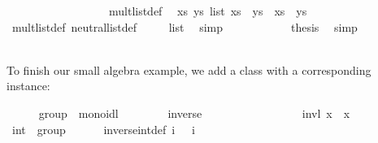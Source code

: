 \begin{isabellebody}
\ \ \ \ \ \ \isamarkupfalse%
\ {\isacharminus}\isanewline
\ \ \ \ \ \ \ \ \isamarkupfalse%
\ mult{\isacharunderscore}list{\isacharunderscore}def\ \isamarkupfalse%
\ {\isachardoublequoteopen}{\isasymAnd}xs\ ys{\isasymColon}{\isasymalpha}\ list{\isachardot}\ xs\ {\isasymotimes}\ ys\ {\isasymequiv}\ xs\ {\isacharat}\ ys{\isachardoublequoteclose}\ \isacommand{{\isachardot}}\isamarkupfalse%
\isanewline
\ \ \ \ \ \ \ \ \isamarkupfalse%
\ \isamarkupfalse%
\ mult{\isacharunderscore}list{\isacharunderscore}def\ neutral{\isacharunderscore}list{\isacharunderscore}def\ \isamarkupfalse%
\ {\isachardoublequoteopen}{\isasymone}\ {\isasymequiv}\ {\isacharbrackleft}{\isacharbrackright}{\isasymColon}{\isasymalpha}\ list{\isachardoublequoteclose}\ \isamarkupfalse%
\ simp\isanewline
\ \ \ \ \ \ \ \ \isamarkupfalse%
\ \isamarkupfalse%
\ {\isacharquery}thesis\ \isamarkupfalse%
\ simp\isanewline
\ \ \ \ \ \ \isamarkupfalse%
\isanewline
\ \ \ \ \isamarkupfalse%
%
\endisatagproof
{\isafoldproof}%
%
\isadelimproof
%
\endisadelimproof
%
\begin{isamarkuptext}%
\noindent To finish our small algebra example, we add a  class
  with a corresponding instance:%
\end{isamarkuptext}%
\isamarkuptrue%
\ \ \ \ \isamarkupfalse%
\ group\ {\isacharequal}\ monoidl\ {\isacharplus}\isanewline
\ \ \ \ \ \ \ inverse\ {\isacharcolon}{\isacharcolon}\ {\isachardoublequoteopen}{\isasymalpha}\ {\isasymRightarrow}\ {\isasymalpha}{\isachardoublequoteclose}\ \ \ \ {\isacharparenleft}{\isachardoublequoteopen}{\isacharparenleft}{\isacharunderscore}{\isasymdiv}{\isacharparenright}{\isachardoublequoteclose}\ {\isacharbrackleft}{}{}{}{}{\isacharbrackright}\ {}{}{}{\isacharparenright}\isanewline
\ \ \ \ \ \ \ invl{\isacharcolon}\ {\isachardoublequoteopen}x{\isasymdiv}\ {\isasymotimes}\ x\ {\isacharequal}\ {\isasymone}{\isachardoublequoteclose}\isanewline
\isanewline
\ \ \ \ \isamarkupfalse%
\ int\ {\isacharcolon}{\isacharcolon}\ group\isanewline
\ \ \ \ \ \ inverse{\isacharunderscore}int{\isacharunderscore}def{\isacharcolon}\ {\isachardoublequoteopen}i{\isasymdiv}\ {\isasymequiv}\ {\isacharminus}\ i{\isachardoublequoteclose}\isanewline
%
\isadelimproof
\ \ \ \ %

\end{isabellebody}
